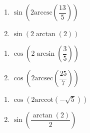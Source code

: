 \documentclass{ximera}
\begin{document}
\begin{multicols}{2}

\begin{enumerate}

\setcounter{enumi}{\value{HW}}

\item  $\sin\left(2\text{arccsc}\left(\dfrac{13}{5}\right)\right)$
\item  $\sin\left(2\arctan\left(2\right)\right)$ 

\setcounter{HW}{\value{enumi}}

\end{enumerate}

\end{multicols}

\begin{multicols}{2}

\begin{enumerate}

\setcounter{enumi}{\value{HW}}

\item  $\cos\left(2 \arcsin\left(\dfrac{3}{5}\right)\right)$
\item  $\cos\left(2 \text{arcsec}\left(\dfrac{25}{7}\right)\right)$

\setcounter{HW}{\value{enumi}}

\end{enumerate}

\end{multicols}

\begin{multicols}{2}

\begin{enumerate}

\setcounter{enumi}{\value{HW}}

\item  $\cos\left(2 \text{arccot}\left(-\sqrt{5}\right)\right)$ 
\item  $\sin\left( \dfrac{\arctan(2)}{2} \right)$ \label{exactvalueidenlast}

\setcounter{HW}{\value{enumi}}

\end{enumerate}

\end{multicols}

\pagebreak
\end{document}
